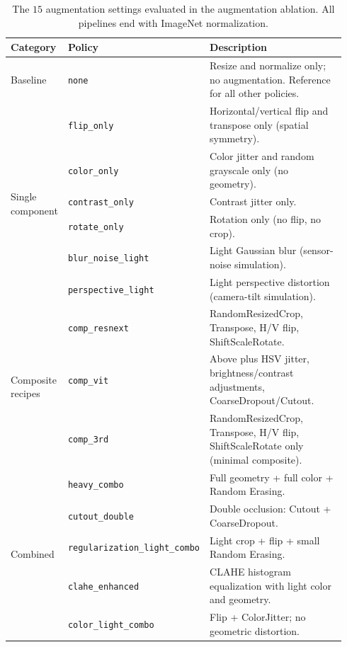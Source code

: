 \documentclass[conference]{IEEEtran}
\begin{document}
\begin{table}[t]
\centering
\caption{The $15$ augmentation settings evaluated in the augmentation ablation. All pipelines end with ImageNet normalization.}
\label{tab:aug_modes}
\renewcommand{\arraystretch}{1.15}
\begin{tabular}{p{0.16\linewidth}p{0.25\linewidth}p{0.53\linewidth}}
\toprule
\textbf{Category} & \textbf{Policy} & \textbf{Description} \\
\midrule
Baseline                       & \texttt{none}                         & Resize and normalize only; no augmentation. Reference for all other policies. \\
\midrule
\multirow{6}{*}{Single component}
                               & \texttt{flip\_only}                   & Horizontal/vertical flip and transpose only (spatial symmetry). \\
                               & \texttt{color\_only}                  & Color jitter and random grayscale only (no geometry). \\
                               & \texttt{contrast\_only}               & Contrast jitter only. \\
                               & \texttt{rotate\_only}                 & Rotation only (no flip, no crop). \\
                               & \texttt{blur\_noise\_light}           & Light Gaussian blur (sensor-noise simulation). \\
                               & \texttt{perspective\_light}           & Light perspective distortion (camera-tilt simulation). \\
\midrule
\multirow{3}{*}{Composite recipes}
                               & \texttt{comp\_resnext}                & RandomResizedCrop, Transpose, H/V flip, ShiftScaleRotate. \\
                               & \texttt{comp\_vit}                    & Above plus HSV jitter, brightness/contrast adjustments, CoarseDropout/Cutout. \\
                               & \texttt{comp\_3rd}                    & RandomResizedCrop, Transpose, H/V flip, ShiftScaleRotate only (minimal composite). \\
\midrule
\multirow{5}{*}{Combined}
                               & \texttt{heavy\_combo}                 & Full geometry + full color + Random Erasing. \\
                               & \texttt{cutout\_double}               & Double occlusion: Cutout + CoarseDropout. \\
                               & \texttt{regularization\_light\_combo} & Light crop + flip + small Random Erasing. \\
                               & \texttt{clahe\_enhanced}              & CLAHE histogram equalization with light color and geometry. \\
                               & \texttt{color\_light\_combo}          & Flip + ColorJitter; no geometric distortion. \\
\bottomrule
\end{tabular}
\end{table}
\end{document}
